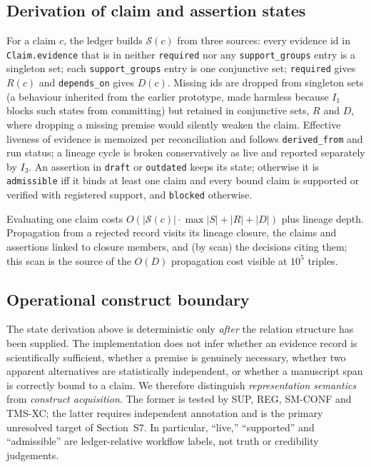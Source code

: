 \documentclass[journal]{IEEEtran}
\begin{document}
\subsection{Derivation of claim and assertion states}
For a claim $c$, the ledger builds $\mathcal{S}(c)$ from three sources: every evidence id in \texttt{Claim.evidence} that is in neither \texttt{required} nor any \texttt{support\_groups} entry is a singleton set; each \texttt{support\_groups} entry is one conjunctive set; \texttt{required} gives $R(c)$ and \texttt{depends\_on} gives $D(c)$. Missing ids are dropped from singleton sets (a behaviour inherited from the earlier prototype, made harmless because $I_1$ blocks such states from committing) but retained in conjunctive sets, $R$ and $D$, where dropping a missing premise would silently weaken the claim. Effective liveness of evidence is memoized per reconciliation and follows \texttt{derived\_from} and run status; a lineage cycle is broken conservatively as live and reported separately by $I_3$. An assertion in \texttt{draft} or \texttt{outdated} keeps its state; otherwise it is \texttt{admissible} iff it binds at least one claim and every bound claim is supported or verified with registered support, and \texttt{blocked} otherwise.

Evaluating one claim costs $O(|\mathcal{S}(c)|\cdot\max|S|+|R|+|D|)$ plus lineage depth. Propagation from a rejected record visits its lineage closure, the claims and assertions linked to closure members, and (by scan) the decisions citing them; this scan is the source of the $O(D)$ propagation cost visible at $10^5$ triples.

\subsection{Operational construct boundary}
The state derivation above is deterministic only \emph{after} the relation structure has been supplied. The implementation does not infer whether an evidence record is scientifically sufficient, whether a premise is genuinely necessary, whether two apparent alternatives are statistically independent, or whether a manuscript span is correctly bound to a claim. We therefore distinguish \emph{representation semantics} from \emph{construct acquisition}. The former is tested by SUP, REG, SM-CONF and TMS-XC; the latter requires independent annotation and is the primary unresolved target of Section~S7. In particular, ``live,'' ``supported'' and ``admissible'' are ledger-relative workflow labels, not truth or credibility judgements.
\end{document}
